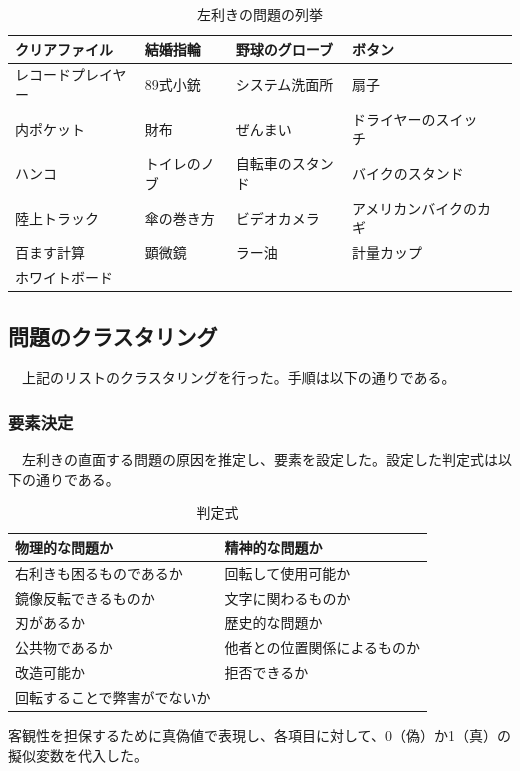 \documentclass{jsarticle}
\begin{document}
\begin{table}[H]
\begin{tabular}{|l|l|l|l|l|}
  クリアファイル &  結婚指輪 &  野球のグローブ &  ボタン \\\hline
  レコードプレイヤー & 89式小銃 &  システム洗面所 &  扇子 \\\hline
  内ポケット &  財布 &  ぜんまい &  ドライヤーのスイッチ \\\hline
   ハンコ &  トイレのノブ &  自転車のスタンド &バイクのスタンド \\\hline
  陸上トラック&  傘の巻き方 &  ビデオカメラ &  アメリカンバイクのカギ \\\hline
  百ます計算 &  顕微鏡 &  ラー油 &  計量カップ \\\hline
  ホワイトボード　& & &\\ \hline
\end{tabular}
\caption{左利きの問題の列挙}
\end{table}

\newpage

\subsection{問題のクラスタリング}

　上記のリストのクラスタリングを行った。手順は以下の通りである。

\subsubsection{要素決定}
　左利きの直面する問題の原因を推定し、要素を設定した。設定した判定式は以下の通りである。

\begin{table}[H]
  \centering\begin{tabular}{|l|l|}\hline
    物理的な問題か & 精神的な問題か\\\hline
    右利きも困るものであるか & 回転して使用可能か \\\hline
    鏡像反転できるものか & 文字に関わるものか \\\hline
    刃があるか & 歴史的な問題か \\\hline
    公共物であるか & 他者との位置関係によるものか \\\hline
    改造可能か & 拒否できるか \\\hline
    回転することで弊害がでないか& \\\hline
  \end{tabular}
  \caption{判定式}
\end{table}


客観性を担保するために真偽値で表現し、各項目に対して、0（偽）か1（真）の擬似変数を代入した。
\end{document}
